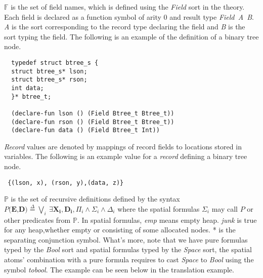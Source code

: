 \documentclass{article}
\theoremstyle{plain}
\begin{document}
$\mathbb{F}$ is the set of field names, which is defined using the \textit{Field} sort in the theory. Each field is declared as a function symbol of arity 0 and result type \textit{Field\ A\ B}. \textit{A} is the sort corresponding to the record type declaring the field and \textit{B} is the sort typing the field. The following is an example of the definition of a binary tree node.
\begin{verbatim}
  typedef struct btree_s {
  struct btree_s* lson;
  struct btree_s* rson;
  int data;
  }* btree_t;
  
  (declare-fun lson () (Field Btree_t Btree_t))
  (declare-fun rson () (Field Btree_t Btree_t))
  (declare-fun data () (Field Btree_t Int))
\end{verbatim}

\textit{Record} values are denoted by mappings of record fields to locations stored in variables. The following is an example value for a \textit{record} defining a binary tree node.
\begin{verbatim}
 {(lson, x), (rson, y),(data, z)}
\end{verbatim}

$\mathbb{P}$ is the set of recursive definitions defined by the syntax $P(\mathbf{E}\text{,}\mathbf{D}\text{)}\overset{\Delta}{=}\bigvee_{i}\ \exists \mathbf{X_i},\mathbf{D_i},\Pi_i\wedge \Sigma_i \wedge \Delta_i$ where the spatial formulas $\Sigma_i$ may call $P$ or other predicates from $\mathbb{P}$. In spatial formulas, \textit{emp} means empty heap. \textit{junk} is true for any heap,whether empty or consisting of some allocated nodes. * is the separating conjunction symbol. What's more, note that we have pure formulas typed by the \textit{Bool} sort and spatial formulas typed by the \textit{Space} sort, the spatial atoms' combination with a pure formula requires to cast \textit{Space} to \textit{Bool} using the symbol \textit{tobool}. The example can be seen below in the translation example.
\end{document}
